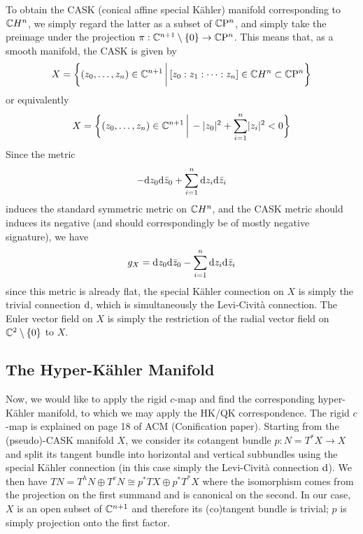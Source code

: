 To obtain the CASK (conical affine special K\"ahler) manifold corresponding to $\mathbb{C} H^n$, we simply regard the latter as a subset of $\mathbb{C}\mathrm{P}^n$, and simply take the preimage under the projection $\pi: \mathbb{C}^{n+1}\setminus \{0\}\to \mathbb{C}\mathrm{P}^n$. This means that, as a smooth manifold, the CASK is given by
\begin{equation*}
	X=\bigg\{ (z_0,\dots,z_n)\in \mathbb{C}^{n+1}\,\bigg|\, [z_0:z_1:\dots : z_n]\in \mathbb{C} H^n\subset \mathbb{C}\mathrm{P}^n\bigg\}
\end{equation*}
or equivalently 
\begin{equation*}
	X=\bigg\{ (z_0,\dots,z_n)\in \mathbb{C}^{n+1}\,\bigg|\, -\lvert z_0 \rvert^2+\sum_{i=1}^n \lvert z_i \rvert^2<0\bigg\}
\end{equation*}
Since the metric
\begin{equation*}
	-\mathrm{d} z_0 \mathrm{d} \bar z_0 + \sum_{i=1}^n\mathrm{d} z_i\mathrm{d} \bar z_i
\end{equation*}
induces the standard symmetric metric on $\mathbb{C} H^n$, and the CASK metric should induces its negative (and should correspondingly be of mostly negative signature), we have
\begin{equation*}
	g_X=\mathrm{d} z_0 \mathrm{d} \bar z_0 - \sum_{i=1}^n\mathrm{d} z_i\mathrm{d} \bar z_i
\end{equation*}
since this metric is already flat, the special K\"ahler connection on $X$ is simply the trivial connection $\mathrm{d}$, which is simultaneously the Levi-Civit\`a connection. The Euler vector field on $X$ is simply the restriction of the radial vector field on $\mathbb{C}^2\setminus\{0\}$ to $X$.

\subsection{The Hyper-K\"ahler Manifold}

Now, we would like to apply the rigid $c$-map and find the corresponding hyper-K\"ahler manifold, to which we may apply the HK/QK correspondence. The rigid $c$-map is explained on page 18 of ACM (Conification paper). Starting from the (pseudo)-CASK manifold $X$, we consider its cotangent bundle $p:N=T^*X\to X$ and split its tangent bundle into horizontal and vertical subbundles using the special K\"ahler connection (in this case simply the Levi-Civit\`a connection $\mathrm{d}$). We then have $TN=T^hN\oplus T^vN\cong p^*TX\oplus p^*T^*X$ where the isomorphism comes from the projection on the first summand and is canonical on the second. In our case, $X$ is an open subset of $\mathbb{C}^{n+1}$ and therefore its (co)tangent bundle is trivial; $p$ is simply projection onto the first factor. 

